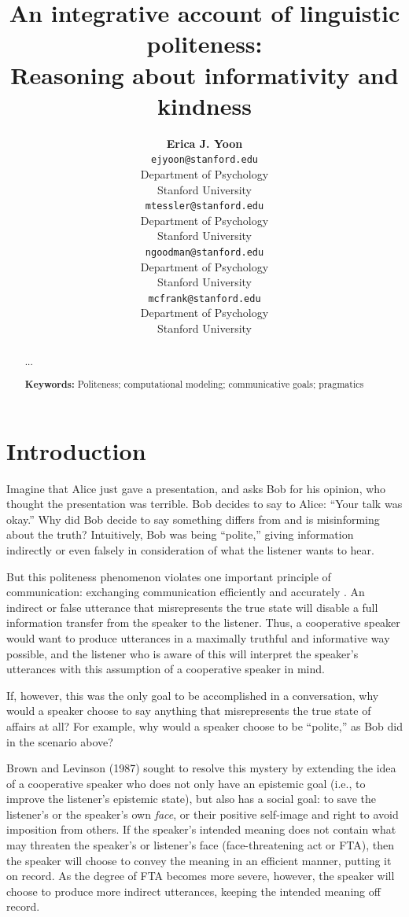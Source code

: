 \documentclass[10pt,letterpaper]{article}
\title{An integrative account of linguistic politeness: \\
Reasoning about informativity and kindness}
\author{{\large \bf Erica J. Yoon} \\
  \texttt{ejyoon@stanford.edu} \\
  Department of Psychology \\
  Stanford University
  \And {\large \bf Michael Henry Tessler} \\
  \texttt{mtessler@stanford.edu} \\
  Department of Psychology \\
  Stanford University
  \And {\large \bf Noah D. Goodman} \\
  \texttt{ngoodman@stanford.edu} \\
  Department of Psychology \\
  Stanford University
  \And {\large \bf Michael C. Frank} \\
  \texttt{mcfrank@stanford.edu} \\
  Department of Psychology \\
  Stanford University}
\begin{document}
\maketitle


\begin{abstract}

...

\textbf{Keywords:} 
Politeness; computational modeling; communicative goals; pragmatics

\end{abstract}


\section{Introduction}

Imagine that Alice just gave a presentation, and asks Bob for his opinion, who thought the presentation was terrible. Bob decides to say to Alice: ``Your talk was okay.'' Why did Bob decide to say something differs from and is misinforming about the truth? Intuitively, Bob was being ``polite,'' giving information indirectly or even falsely in consideration of what the listener wants to hear.

But this politeness phenomenon violates one important principle of communication: exchanging communication efficiently and accurately \cite{Grice1975}. An indirect or false utterance that misrepresents the true state will disable a full information transfer from the speaker to the listener. Thus, a cooperative speaker would want to produce utterances in a maximally truthful and informative way possible, and the listener who is aware of this will interpret the speaker's utterances with this assumption of a cooperative speaker in mind.

If, however, this was the only goal to be accomplished in a conversation, why would a speaker choose to say anything that misrepresents the true state of affairs at all? For example, why would a speaker choose to be ``polite,'' as Bob did in the scenario above?

Brown and Levinson (1987) sought to resolve this mystery by extending the idea of a cooperative speaker who does not only have an epistemic goal (i.e., to improve the listener's epistemic state), but also has a social goal: to save the listener's or the speaker's own \emph{face}, or their positive self-image and right to avoid imposition from others. If the speaker's intended meaning does not contain what may threaten the speaker's or listener's face (face-threatening act or FTA), then the speaker will choose to convey the meaning in an efficient manner, putting it on record. As the degree of FTA becomes more severe, however, the speaker will choose to produce more indirect utterances, keeping the intended meaning off record.
\end{document}
